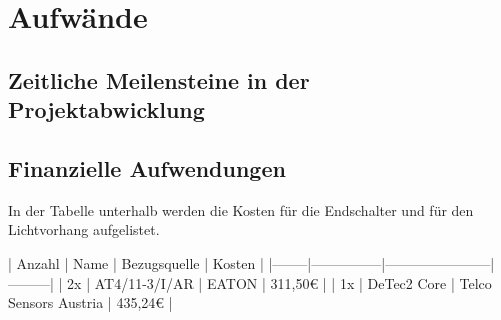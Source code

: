 \section{Aufwände}

\subsection{Zeitliche Meilensteine in der Projektabwicklung}

\begin{HistoryTimeline}[Meilensteine]
\end{HistoryTimeline}

\subsection{Finanzielle Aufwendungen}

In der Tabelle unterhalb werden die Kosten für die Endschalter und für den Lichtvorhang aufgelistet.

\begin{markdown}

\begin{center}

| Anzahl | Name          | Bezugsquelle          | Kosten  |
|--------|---------------|-----------------------|---------|
| 2x     | AT4/11-3/I/AR | EATON                 | 311,50€ |
| 1x     | DeTec2 Core   | Telco Sensors Austria | 435,24€ |

\end{center}

\end{markdown}
